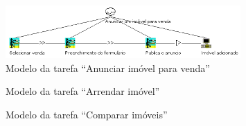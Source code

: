 \begin{figure}[H]
    \centering
    \includegraphics[width=0.8\textwidth]{images/Tarefas/hta_vender}
    \caption{Modelo da tarefa ``Anunciar imóvel para venda''}
    \label{fig:hat_vender}
\end{figure}

\begin{figure}[H]
    \centering
    \caption{Modelo da tarefa ``Arrendar imóvel''}
    \label{fig:hat_arrendar}
\end{figure}

\begin{figure}[H]
    \centering
    \caption{Modelo da tarefa ``Comparar imóveis''}
    \label{fig:hat_comparar}
\end{figure}

